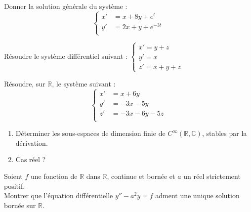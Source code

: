 
\begin{exer}
Donner la solution g\'en\'erale du syst\`eme :
\begin{equation}
  \left\{
      \begin{aligned}
        x'&=x+8y+e^t \\
        y'&=2x+y+e^{-3t} \\
      \end{aligned}
    \right.
\end{equation}
\end{exer}

\begin{exer}
R\'esoudre le syst\`eme diff\'erentiel suivant :
$\left\{
\begin{array}{l}
  x'=y+z\\
  y'=x\\
  z'=x+y+z
\end{array}
\right.$
\end{exer}

\begin{exer}
R\'esoudre, sur $\mathbb{R}$, le syst\`eme suivant :
\begin{equation}
\left\{
\begin{aligned}
x'&=x+6y\\
y'&=-3x-5y\\
z'&=-3x-6y-5z\\
\end{aligned}
\right.
\end{equation}
\end{exer}

\begin{exer}
\begin{enumerate}
\item Déterminer les sous-espaces de dimension finie de $C^{\infty}(\mathbb{R},\mathbb{C})$, stables par la dérivation.
\item Cas réel ?
\end{enumerate}
\end{exer}

\begin{exer}
Soient $f$ une fonction de $\mathbb{R}$ dans $\mathbb{R}$, continue et born\'ee et $a$ un r\'eel strictement positif.\\
Montrer que l'\'equation diff\'erentielle $y''-a^2y=f$ adment une unique solution born\'ee sur $\mathbb{R}$.
\end{exer}

